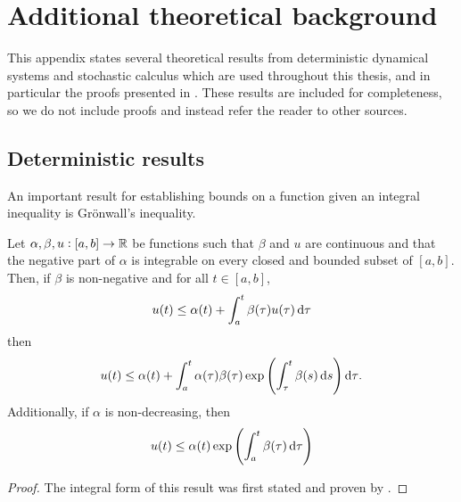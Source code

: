 \chapter{Additional theoretical background}\label{app:theory}
This appendix states several theoretical results from deterministic dynamical systems and stochastic calculus which are used throughout this thesis, and in particular the proofs presented in .
These results are included for completeness, so we do not include proofs and instead refer the reader to other sources.

\section{Deterministic results}


An important result for establishing bounds on a function given an integral inequality is Gr\"onwall's inequality.

\begin{theorem}\label{thm:gronwall}
	Let \(\alpha, \beta, u: [a,b] \to \mathbb{R}\) be functions such that \(\beta\) and \(u\) are continuous and that the negative part of \(\alpha\) is integrable on every closed and bounded subset of \([a,b]\).
	Then, if \(\beta\) is non-negative and for all \(t \in [a,b]\),
	\[
		u(t) \leq \alpha(t) + \int_a^t{\beta(\tau)u(\tau)\dif\tau}
	\]
	then
	\[
		u(t) \leq \alpha(t) + \int_a^t{\alpha(\tau)\beta(\tau)\exp\left(\int_\tau^{t}{\beta(s)\dif s}\right)\dif\tau}.
	\]
	Additionally, if \(\alpha\) is non-decreasing, then
	\[
		u(t) \leq \alpha(t) \exp\left(\int_a^t{\beta(\tau)\dif\tau}\right)
	\]
\end{theorem}
\begin{proof}
	The integral form of this result was first stated and proven by \citet{Bellman_1943_StabilitySolutionsLinear}.
\end{proof}


